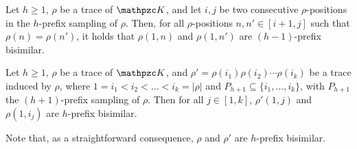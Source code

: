 \begin{lemma}\label{lemma:prefixSamplingOne} Let $h\geq 1$, $\rho$ be a trace of $\Ku$, and let $i,j$ be two consecutive $\rho$-positions in the $h$-prefix sampling of $\rho$.
Then, for all $\rho$-positions $n,n'\in [i+1,j]$ such that $\rho(n)=\rho(n')$, it holds that $\rho(1,n)$ and $\rho(1,n')$ are $(h-1)$-prefix bisimilar.
\end{lemma}

\begin{lemma}\label{lemma:prefixSamplingTwo} Let $h\geq 1$, $\rho$ be a trace of $\Ku$, and $\rho'=\rho(i_1)\rho(i_2)\cdots \rho(i_k)$ be a trace induced by $\rho$, where $1= i_1<i_2 <\ldots < i_k=|\rho|$ and $P_{h+1} \subseteq\{i_1,\ldots,i_k\}$, with $P_{h+1}$ the \mbox{$(h+1)$-prefix} sampling of $\rho$.
Then for all $j\!\in\! [1,k]$, $\rho'(1,j)$ and $\rho(1,i_j)$ are \mbox{$h$-prefix} bisimilar.
\end{lemma}
Note that, as a straightforward consequence, $\rho$ and $\rho'$ are $h$-prefix bisimilar.
